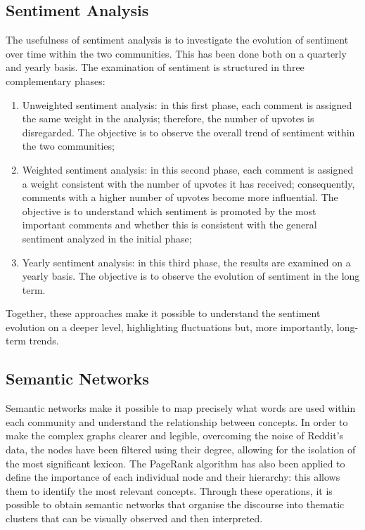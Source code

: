 \documentclass[conference]{IEEEtran}
\begin{document}
\subsection{Sentiment Analysis}
The usefulness of sentiment analysis is to investigate the evolution of sentiment over time within the two communities. This has been done both on a quarterly and yearly basis. The examination of sentiment is structured in three complementary phases:
\begin{enumerate}
    \item Unweighted sentiment analysis: in this first phase, each comment is assigned the same weight in the analysis; therefore, the number of upvotes is disregarded. The objective is to observe the overall trend of sentiment within the two communities;
    \item Weighted sentiment analysis: in this second phase, each comment is assigned a weight consistent with the number of upvotes it has received; consequently, comments with a higher number of upvotes become more influential. The objective is to understand which sentiment is promoted by the most important comments and whether this is consistent with the general sentiment analyzed in the initial phase;
    \item Yearly sentiment analysis: in this third phase, the results are examined on a yearly basis. The objective is to observe the evolution of sentiment in the long term.
\end{enumerate}
Together, these approaches make it possible to understand the sentiment evolution on a deeper level, highlighting fluctuations but, more importantly, long-term trends.

\subsection{Semantic Networks}
Semantic networks make it possible to map precisely what words are used within each community and understand the relationship between concepts. In order to make the complex graphs clearer and legible, overcoming the noise of Reddit’s data, the nodes have been filtered using their degree, allowing for the isolation of the most significant lexicon. The PageRank algorithm has also been applied to define the importance of each individual node and their hierarchy: this allows them to identify the most relevant concepts. Through these operations, it is possible to obtain semantic networks that organise the discourse into thematic clusters that can be visually observed and then interpreted.
\end{document}
